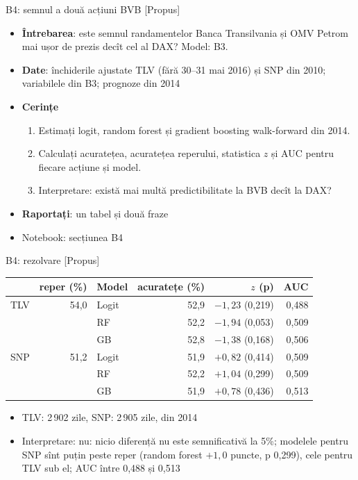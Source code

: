 \begin{frame}{B4: semnul a două acțiuni BVB [Propus]}
\itemsize{\footnotesize}
\begin{itemize}
\item \textbf{Întrebarea}: este semnul randamentelor Banca Transilvania și OMV Petrom mai ușor de prezis decît cel al DAX? Model: B3.
\item \textbf{Date}: închiderile ajustate TLV (fără 30--31 mai 2016) și SNP din 2010; variabilele din B3; prognoze din 2014
\item \textbf{Cerințe}
\begin{enumerate}
    \item Estimați logit, random forest și gradient boosting walk-forward din 2014.
    \item Calculați acuratețea, acuratețea reperului, statistica $z$ și AUC pentru fiecare acțiune și model.
    \item Interpretare: există mai multă predictibilitate la BVB decît la DAX?
\end{enumerate}
\item \textbf{Raportați}: un tabel și două fraze
\item Notebook: secțiunea B4
\end{itemize}
\end{frame}

\ifsolutions
\begin{frame}{B4: rezolvare [Propus]}
\itemsize{\footnotesize}
\begin{center}
\footnotesize
\begin{tabular}{lrlrrr}
\toprule
& reper (\%) & Model & acuratețe (\%) & $z$ (p) & AUC \\
\midrule
TLV & 54{,}0 & Logit & 52{,}9 & ${-1{,}23}$ (0{,}219) & 0{,}488 \\
 &  & RF & 52{,}2 & ${-1{,}94}$ (0{,}053) & 0{,}509 \\
 &  & GB & 52{,}8 & ${-1{,}38}$ (0{,}168) & 0{,}506 \\
\midrule
SNP & 51{,}2 & Logit & 51{,}9 & ${+0{,}82}$ (0{,}414) & 0{,}509 \\
 &  & RF & 52{,}2 & ${+1{,}04}$ (0{,}299) & 0{,}509 \\
 &  & GB & 51{,}9 & ${+0{,}78}$ (0{,}436) & 0{,}513 \\
\bottomrule
\end{tabular}
\end{center}
\begin{itemize}
    \item TLV: 2\,902 zile, SNP: 2\,905 zile, din 2014
    \item Interpretare: nu: nicio diferență nu este semnificativă la 5\%; modelele pentru SNP sînt puțin peste reper (random forest $+1{,}0$ puncte, p 0{,}299), cele pentru TLV sub el; AUC între 0{,}488 și 0{,}513
\end{itemize}
\end{frame}
\fi


